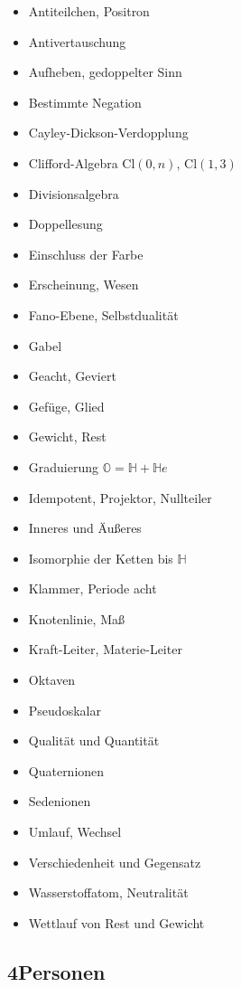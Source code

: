\documentclass[11pt,a4paper]{article}
\newcommand{\HH}{\mathbb H}
\newcommand{\Oc}{\mathbb O}
\newcommand{\Cl}{\mathrm{Cl}}
\begin{document}
\begin{itemize}[leftmargin=1.2em,itemsep=0pt]
\item Antiteilchen, Positron
\item Antivertauschung
\item Aufheben, gedoppelter Sinn
\item Bestimmte Negation
\item Cayley-Dickson-Verdopplung
\item Clifford-Algebra $\Cl(0,n)$, $\Cl(1,3)$
\item Divisionsalgebra
\item Doppellesung
\item Einschluss der Farbe
\item Erscheinung, Wesen
\item Fano-Ebene, Selbstdualität
\item Gabel
\item Geacht, Geviert
\item Gefüge, Glied
\item Gewicht, Rest
\item Graduierung $\Oc=\HH+\HH e$
\item Idempotent, Projektor, Nullteiler
\item Inneres und Äußeres
\item Isomorphie der Ketten bis $\HH$
\item Klammer, Periode acht
\item Knotenlinie, Maß
\item Kraft-Leiter, Materie-Leiter
\item Oktaven
\item Pseudoskalar
\item Qualität und Quantität
\item Quaternionen
\item Sedenionen
\item Umlauf, Wechsel
\item Verschiedenheit und Gegensatz
\item Wasserstoffatom, Neutralität
\item Wettlauf von Rest und Gewicht
\end{itemize}

\subsection*{4\quad Personen}
\end{document}
